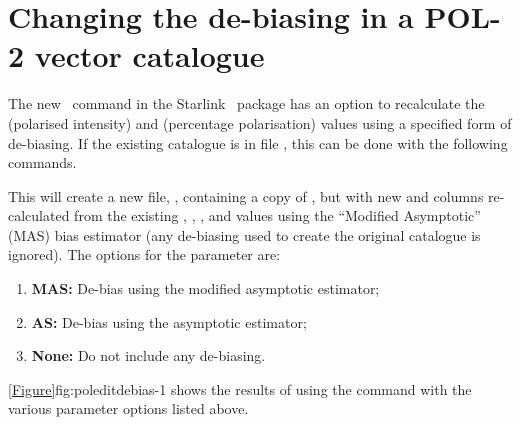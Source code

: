 \section{Changing the de-biasing in a POL-2 vector catalogue}

The new \poledit\ command in the Starlink \POLPACK\ package has an option to recalculate the  (polarised intensity) and  (percentage polarisation) values using a specified form of de-biasing. If the existing catalogue is in file , this can be done with the following commands.

\begin{terminalv}
\end{terminalv}

This will create a new file, , containing a copy of , but with new  and  columns re-calculated from the  existing , , , and  values using the ``Modified Asymptotic'' (MAS) bias estimator (any de-biasing used to create the original catalogue is ignored).  The options for the  parameter are:

\begin{enumerate}
\item {\bf MAS:} De-bias using the modified asymptotic estimator;
\item {\bf AS:} De-bias using the asymptotic estimator;
\item {\bf None:} Do not include any de-biasing.
\end{enumerate}

\cref{Figure}{fig:poleditdebias-1}{} shows the results of using the  command with the various   parameter options listed above.

